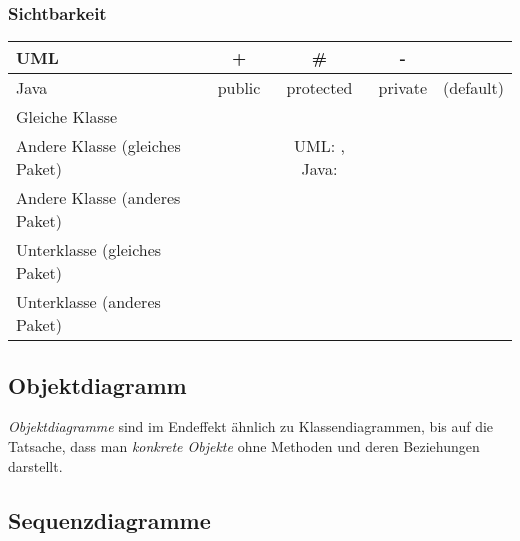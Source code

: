 \documentclass{panikzettel}
\newcommand{\cmark}{\text{\ding{51}}}
\newcommand{\xmark}{\text{\ding{55}}}
\begin{document}
\subsubsection{Sichtbarkeit}
\begin{tabular}{|l|c|c|c|c|}
  \hline
  UML & + & \# & - & \\
  \hline
  Java & public & protected & private & (default)\\
  \hline
  \hline
  Gleiche Klasse & \cmark & \cmark & \cmark & \cmark\\
  \hline
  Andere Klasse (gleiches Paket) & \cmark & UML: \xmark, Java: \cmark & \xmark & \cmark\\
  \hline
  Andere Klasse (anderes Paket) & \cmark & \xmark & \xmark & \xmark\\
  \hline
  Unterklasse (gleiches Paket) & \cmark & \cmark & \xmark & \cmark\\
  \hline
  Unterklasse (anderes Paket) & \cmark & \cmark & \xmark & \xmark\\
  \hline
\end{tabular}

\subsection{Objektdiagramm}
\label{sec:objektdiagramm}

\emph{Objektdiagramme} sind im Endeffekt ähnlich zu Klassendiagrammen, bis auf die Tatsache, dass man \emph{konkrete Objekte} ohne Methoden und deren Beziehungen darstellt.

\subsection{Sequenzdiagramme}
\label{sec:sequenzdiagramme}
\end{document}
